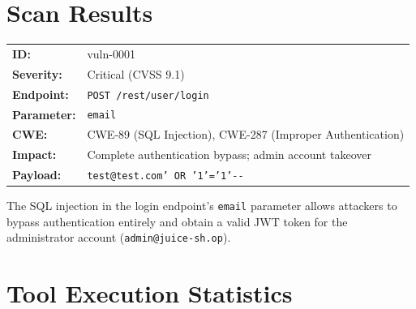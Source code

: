 \documentclass[12pt,a4paper,twoside]{report}
\begin{document}
\section{Scan Results}

\begin{critbox}
\begin{tabularx}{\textwidth}{lX}
\textbf{ID:}         & vuln-0001 \\
\textbf{Severity:}   & Critical (CVSS 9.1) \\
\textbf{Endpoint:}   & \texttt{POST /rest/user/login} \\
\textbf{Parameter:}  & \texttt{email} \\
\textbf{CWE:}        & CWE-89 (SQL Injection), CWE-287 (Improper Authentication) \\
\textbf{Impact:}     & Complete authentication bypass; admin account takeover \\
\textbf{Payload:}    & \texttt{test@test.com' OR '1'='1'-{}-} \\
\end{tabularx}

\vspace{0.5em}
The SQL injection in the login endpoint's \texttt{email} parameter allows attackers to bypass authentication entirely and obtain a valid JWT token for the administrator account (\texttt{admin@juice-sh.op}).
\end{critbox}

\section{Tool Execution Statistics}
\end{document}
